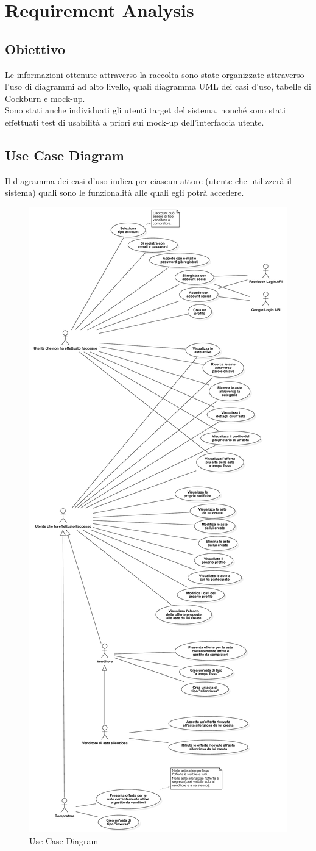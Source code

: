
\chapter{Requirement Analysis}
    \section{Obiettivo}
        Le informazioni ottenute attraverso la raccolta sono state organizzate attraverso l'uso di diagrammi ad alto livello, quali diagramma UML dei casi d'uso, tabelle di Cockburn e mock-up. \\
        Sono stati anche individuati gli utenti target del sistema, nonché sono stati effettuati test di usabilità a priori sui mock-up dell'interfaccia utente.

    \section{Use Case Diagram}
        Il diagramma dei casi d'uso indica per ciascun attore (utente che utilizzerà il sistema) quali sono le funzionalità alle quali egli potrà accedere.
        \begin{figure}[htbp!]
            \centering
                \includegraphics[width=0.32\linewidth]{Immagini/Diagrammi/UseCaseDiagram.pdf}
            \caption{Use Case Diagram}
            \label{fig:Use Case Diagram}
        \end{figure}
    
